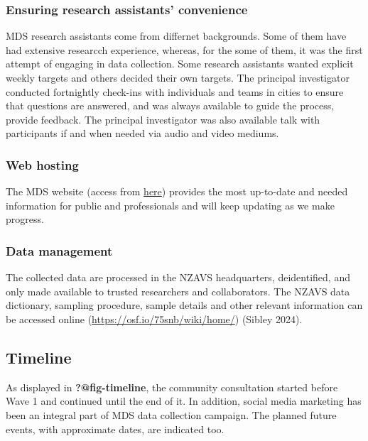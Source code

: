 \documentclass[
]{interact}
\begin{document}
\subsubsection{Ensuring research assistants'
convenience}\label{ensuring-research-assistants-convenience}

MDS research assistants come from differnet backgrounds. Some of them
have had extensive researcch experience, whereas, for the some of them,
it was the first attempt of engaging in data collection. Some research
assistants wanted explicit weekly targets and others decided their own
targets. The principal investigator conducted fortnightly check-ins with
individuals and teams in cities to ensure that questions are answered,
and was always available to guide the process, provide feedback. The
principal investigator was also available talk with participants if and
when needed via audio and video mediums.

\subsubsection{Web hosting}\label{web-hosting}

The MDS website (access from
\href{https://linktr.ee/muslimdiversity}{here}) provides the most
up-to-date and needed information for public and professionals and will
keep updating as we make progress.

\subsubsection{Data management}\label{data-management}

The collected data are processed in the NZAVS headquarters,
deidentified, and only made available to trusted researchers and
collaborators. The NZAVS data dictionary, sampling procedure, sample
details and other relevant information can be accessed online
(\url{https://osf.io/75snb/wiki/home/}) (Sibley 2024).

\subsection{Timeline}\label{timeline}

As displayed in \textbf{?@fig-timeline}, the community consultation
started before Wave 1 and continued until the end of it. In addition,
social media marketing has been an integral part of MDS data collection
campaign. The planned future events, with approximate dates, are
indicated too.
\end{document}
